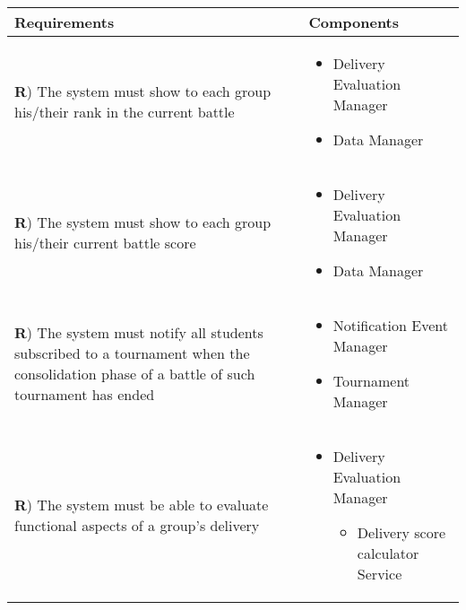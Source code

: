 \documentclass[../DD.tex]{subfiles}
\newcounter{rown}
\newcommand{\rowIndex}{\arabic{rown}\stepcounter{rown}}
\begin{document}
    \begin{table}[h!]
        \begin{center}
            \hspace*{-2cm}
            \begin{tabular}{|m{20em}|m{20em}|}
            \hline
            \textbf{Requirements} & \textbf{Components}\\
            \hline
            \textbf{R\rowIndex}) The system must show to each group his/their rank in the current battle & \begin{itemize}
                \item Delivery Evaluation Manager
                \item Data Manager
            \end{itemize}\\
            \hline
            \textbf{R\rowIndex}) The system must show to each group his/their current battle score & \begin{itemize}
                \item Delivery Evaluation Manager
                \item Data Manager 
            \end{itemize}\\
            \hline
            \textbf{R\rowIndex}) The system must notify all students subscribed to a tournament when the consolidation phase of a battle of such tournament has ended & \begin{itemize}
                \item Notification Event Manager
                \item Tournament Manager
            \end{itemize}\\
            \hline
            \textbf{R\rowIndex}) The system must be able to evaluate functional aspects of a group's delivery & \begin{itemize}
                \item Delivery Evaluation Manager
                \begin{itemize}
                    \item Delivery score calculator Service
                \end{itemize} 
            \end{itemize}\\

\end{tabular}
\end{center}
\end{table}
\end{document}
